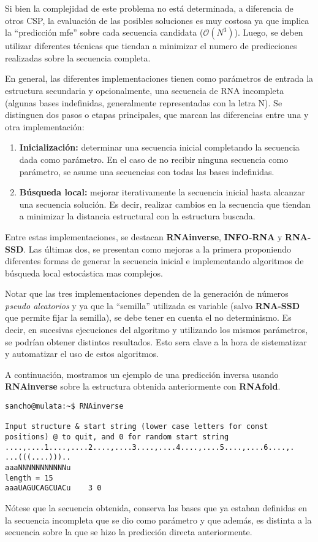 Si bien la complejidad de este problema no est\'a determinada, a diferencia de
otros \ac{CSP}, la evaluaci\'on de las posibles soluciones es muy costosa ya que
implica la ``predicci\'on \ac{mfe}'' sobre cada secuencia candidata
($\mathcal{O}(N^{3})$). Luego, se deben utilizar diferentes t\'ecnicas que
tiendan a minimizar el numero de predicciones realizadas sobre la secuencia
completa.

En general, las diferentes implementaciones tienen como par\'ametros de
entrada la estructura secundaria y opcionalmente, una secuencia de \ac{RNA}
incompleta (algunas bases indefinidas, generalmente representadas con la
letra N). Se distinguen dos pasos o etapas principales, que marcan las
diferencias entre una y otra implementaci\'on:
\begin{enumerate}
 \item \textbf{Inicializaci\'on:} determinar una secuencia inicial completando
la secuencia dada como par\'ametro. En el caso de no recibir ninguna secuencia
como par\'ametro, se asume una secuencias con todas las bases indefinidas.
 \item \textbf{B\'usqueda local:} mejorar iterativamente la secuencia inicial
hasta alcanzar una secuencia soluci\'on. Es decir, realizar cambios en la
secuencia que tiendan a minimizar la distancia estructural con la estructura
buscada.
\end{enumerate}

Entre estas implementaciones, se destacan \textbf{RNAinverse}\cite{Hofacker94},
\textbf{INFO-RNA}\cite{Busch07} y \textbf{RNA-SSD}\cite{Andronescu03}. Las
\'ultimas dos, se presentan como mejoras a la primera proponiendo diferentes
formas de generar la secuencia inicial e implementando algoritmos de b\'usqueda
local estoc\'astica mas complejos.

Notar que las tres implementaciones dependen de la generaci\'on de n\'umeros
\textit{pseudo aleatorios} y ya que la ``semilla'' utilizada es variable (salvo
\textbf{RNA-SSD} que permite fijar la semilla), se debe tener en cuenta el no
determinismo. Es decir, en sucesivas ejecuciones del algoritmo y utilizando los
mismos par\'ametros, se podr\'ian obtener distintos resultados. Esto sera clave
a la hora de sistematizar y automatizar el uso de estos algoritmos.

A continuaci\'on, mostramos un ejemplo de una predicci\'on inversa usando
\textbf{RNAinverse} sobre la estructura obtenida anteriormente con
\textbf{RNAfold}.

\begin{verbatim}
sancho@mulata:~$ RNAinverse 

Input structure & start string (lower case letters for const 
positions) @ to quit, and 0 for random start string
....,....1....,....2....,....3....,....4....,....5....,....6....,.
...(((....)))..
aaaNNNNNNNNNNNu
length = 15
aaaUAGUCAGCUACu    3 0
\end{verbatim}

N\'otese que la secuencia obtenida, conserva las bases que ya estaban definidas
en la secuencia incompleta que se dio como par\'ametro y que adem\'as, es
distinta a la secuencia sobre la que se hizo la predicci\'on directa
anteriormente.

